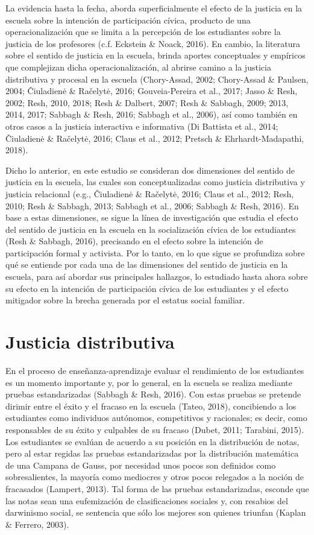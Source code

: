 \documentclass[12pt,twoside]{templates/facsothesis}
\begin{document}
La evidencia hasta la fecha, aborda superficialmente el efecto de la justicia en la escuela sobre la intención de participación cívica, producto de una operacionalización que se limita a la percepción de los estudiantes sobre la justicia de los profesores (c.f. Eckstein \& Noack, 2016). En cambio, la literatura sobre el sentido de justicia en la escuela, brinda aportes conceptuales y empíricos que complejizan dicha operacionalización, al abrirse camino a la justicia distributiva y procesal en la escuela (Chory-Assad, 2002; Chory-Assad \& Paulsen, 2004; Čiuladienė \& Račelytė, 2016; Gouveia-Pereira et al., 2017; Jasso \& Resh, 2002; Resh, 2010, 2018; Resh \& Dalbert, 2007; Resh \& Sabbagh, 2009; 2013, 2014, 2017; Sabbagh \& Resh, 2016; Sabbagh et al., 2006), así como también en otros casos a la justicia interactiva e informativa (Di Battista et al., 2014; Čiuladienė \& Račelytė, 2016; Claus et al., 2012; Pretsch \& Ehrhardt-Madapathi, 2018).

Dicho lo anterior, en este estudio se consideran dos dimensiones del sentido de justicia en la escuela, las cuales son conceptualizadas como justicia distributiva y justicia relacional (e.g., Čiuladienė \& Račelytė, 2016; Claus et al., 2012; Resh, 2010; Resh \& Sabbagh, 2013; Sabbagh et al., 2006; Sabbagh \& Resh, 2016). En base a estas dimensiones, se sigue la línea de investigación que estudia el efecto del sentido de justicia en la escuela en la socialización cívica de los estudiantes (Resh \& Sabbagh, 2016), precisando en el efecto sobre la intención de participación formal y activista. Por lo tanto, en lo que sigue se profundiza sobre qué se entiende por cada una de las dimensiones del sentido de justicia en la escuela, para así abordar sus principales hallazgos, lo estudiado hasta ahora sobre su efecto en la intención de participación cívica de los estudiantes y el efecto mitigador sobre la brecha generada por el estatus social familiar.

\hypertarget{justicia-distributiva}{%
\section{Justicia distributiva}\label{justicia-distributiva}}

En el proceso de enseñanza-aprendizaje evaluar el rendimiento de los estudiantes es un momento importante y, por lo general, en la escuela se realiza mediante pruebas estandarizadas (Sabbagh \& Resh, 2016). Con estas pruebas se pretende dirimir entre el éxito y el fracaso en la escuela (Tateo, 2018), concibiendo a los estudiantes como individuos autónomos, competitivos y racionales; es decir, como responsables de su éxito y culpables de su fracaso (Dubet, 2011; Tarabini, 2015). Los estudiantes se evalúan de acuerdo a su posición en la distribución de notas, pero al estar regidas las pruebas estandarizadas por la distribución matemática de una Campana de Gauss, por necesidad unos pocos son definidos como sobresalientes, la mayoría como mediocres y otros pocos relegados a la noción de fracasados (Lampert, 2013). Tal forma de las pruebas estandarizadas, esconde que las notas sean una eufemización de clasificaciones sociales y, con resabios del darwinismo social, se sentencia que sólo los mejores son quienes triunfan (Kaplan \& Ferrero, 2003).
\end{document}
